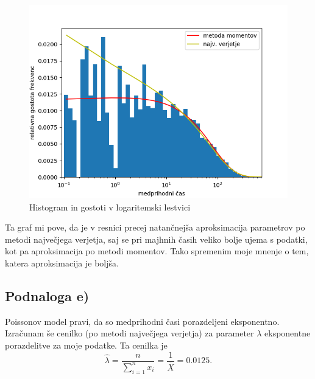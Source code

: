 \documentclass[12pt, a4paper]{article}
\begin{document}
\begin{figure}[h!]
\includegraphics[width=\linewidth]{histogram_log.png}
\centering
\caption{Histogram in gostoti v logaritemski lestvici}
\end{figure}

Ta graf mi pove, da je v resnici precej natančnejša aproksimacija parametrov po metodi največjega verjetja, saj se pri majhnih časih veliko bolje ujema s podatki, kot pa aproksimacija po metodi momentov. Tako spremenim moje mnenje o tem, katera aproksimacija je boljša.

\subsection*{Podnaloga e)}
Poissonov model pravi, da so medprihodni časi porazdeljeni eksponentno. Izračunam še cenilko (po metodi največjega verjetja) za parameter $\lambda$ eksponentne porazdelitve za moje podatke. Ta cenilka je
\[
\widehat{\lambda} = \frac{n}{\sum_{i=1}^n x_i} = \frac{1}{\overline{X}} = 0.0125.
\]
\end{document}
